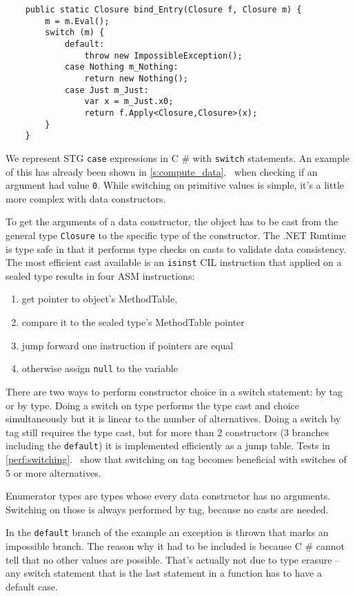 \documentclass[en]{pracamgr}
\newcommand{\shrp}{%
  {\fontfamily{ppl}\selectfont\#%
  }}
\newcommand{\myref}[1]{\ref{#1}.~\textit{\nameref{#1}}}
\begin{document}
\begin{verbatim}
    public static Closure bind_Entry(Closure f, Closure m) {
        m = m.Eval();
        switch (m) {
            default: 
                throw new ImpossibleException();
            case Nothing m_Nothing:
                return new Nothing();
            case Just m_Just:
                var x = m_Just.x0;
                return f.Apply<Closure,Closure>(x);
        }
    }
\end{verbatim}

We represent STG \texttt{case} expressions in C\shrp{} with
\texttt{switch} statements. An example of this has already
been shown in \myref{s:compute_data} when checking if an
argument had value \texttt{0}. While switching on primitive
values is simple, it's a little more complex with data constructors.

To get the arguments of a data constructor, the object has
to be cast from the general type \texttt{Closure} to the
specific type of the constructor.
The .NET Runtime is type safe in that it performs type
checks on casts to validate data consistency.
The most efficient cast available is an \texttt{isinst} CIL
instruction that applied on a sealed type results in four ASM instructions:

\begin{enumerate}
    \item get pointer to object's MethodTable,
    \item compare it to the sealed type's MethodTable pointer
    \item jump forward one instruction if pointers are equal
    \item otherwise assign \texttt{null} to the variable 
\end{enumerate}

There are two ways to perform constructor choice in a switch statement:
by tag or by type. Doing a switch on type performs the type
cast and choice simultaneously but it is linear to the
number of alternatives. Doing a switch by tag still
requires the type cast, but for more than 2 constructors (3
branches including the \texttt{default}) it is implemented efficiently as a jump table.
Tests in \myref{perf:switching} show that switching on tag
becomes beneficial with switches of 5 or more alternatives.

Enumerator types are types whose every data constructor has no arguments.
Switching on those is always performed by tag, because no casts are needed.

In the \texttt{default} branch of the example an exception is thrown that marks
an impossible branch.
The reason why it had to be included is because C\shrp{}
cannot tell that no other values are possible.
That's actually not due to type erasure -- any switch statement that
is the last statement in a function has to have a default case.
\end{document}
